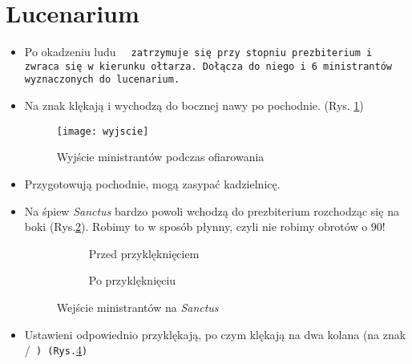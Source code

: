 \section{Lucenarium}


\begin{itemize}
	\item Po okadzeniu ludu \tt~ zatrzymuje się przy stopniu prezbiterium i
	      zwraca się w kierunku ołtarza. Dołącza do niego  i 6 ministrantów
	      wyznaczonych do lucenarium.
	\item Na znak  klękają i wychodzą do bocznej nawy po pochodnie.	(Rys.
	      \ref{fig:wyjscie})
	      \begin{figure}[ht]
		      \centering
		      \texttt{[image: wyjscie]}
		      \caption{Wyjście ministrantów podczas ofiarowania}
		      \label{fig:wyjscie}
	      \end{figure}
	\item Przygotowują pochodnie, mogą zasypać kadzielnicę.
	\item Na śpiew \textit{Sanctus} bardzo powoli wchodzą do prezbiterium
	      rozchodząc się na boki (Rys.\ref{fig:wejscie_1}). Robimy to w sposób
	      płynny, czyli nie robimy obrotów o 90\textdegree!
	      \begin{figure}[ht]
		      \begin{subfigure}[t]{.45\linewidth}
			      \centering\usebox{\imagebox}
			      \caption{Przed przyklęknięciem}
			      \label{fig:wejscie_1}
		      \end{subfigure}\qquad
		      \begin{subfigure}[t]{.55\linewidth}
			      \centering{}%
			      \caption{Po przyklęknięciu}
			      \label{fig:wejscie_2}
		      \end{subfigure}
		      \caption{Wejście ministrantów na \textit{Sanctus}}
	      \end{figure}
	\item Ustawieni odpowiednio przyklękają, po czym klękają na dwa kolana (na
	      znak \big/\tt~)
	      (Rys.\ref{fig:wejscie_2})
	      \begin{figure}[ht]

\end{figure}
\end{itemize}
